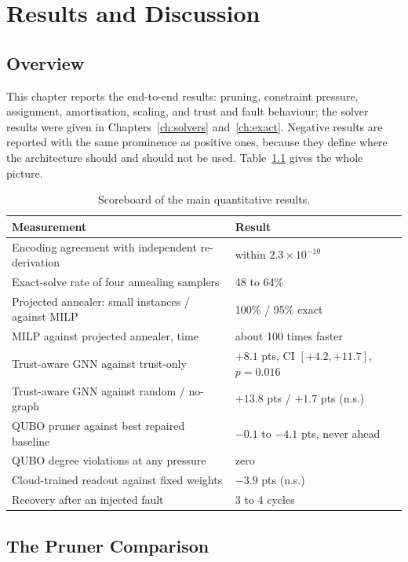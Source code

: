 \chapter{Results and Discussion}
\label{ch:results}

\section{Overview}

This chapter reports the end-to-end results: pruning, constraint pressure,
assignment, amortisation, scaling, and trust and fault behaviour; the solver
results were given in Chapters~\ref{ch:solvers} and~\ref{ch:exact}. Negative
results are reported with the same prominence as positive ones, because they
define where the architecture should and should not be used.
Table~\ref{tab:res:scoreboard} gives the whole picture.

\begin{table}[htbp]
\centering
\caption{Scoreboard of the main quantitative results.}
\label{tab:res:scoreboard}
\small
\begin{tabularx}{\linewidth}{@{}X l@{}}
\toprule
Measurement & Result \\
\midrule
Encoding agreement with independent re-derivation & within $2.3\times10^{-10}$ \\
Exact-solve rate of four annealing samplers & 48 to 64\% \\
Projected annealer: small instances / against MILP & 100\% / 95\% exact \\
MILP against projected annealer, time & about 100 times faster \\
Trust-aware GNN against trust-only & $+8.1$ pts, CI $[+4.2,+11.7]$, $p=0.016$ \\
Trust-aware GNN against random / no-graph & $+13.8$ pts / $+1.7$ pts (n.s.) \\
QUBO pruner against best repaired baseline & $-0.1$ to $-4.1$ pts, never ahead \\
QUBO degree violations at any pressure & zero \\
Cloud-trained readout against fixed weights & $-3.9$ pts (n.s.) \\
Recovery after an injected fault & 3 to 4 cycles \\
\bottomrule
\end{tabularx}
\end{table}

\section{The Pruner Comparison}

